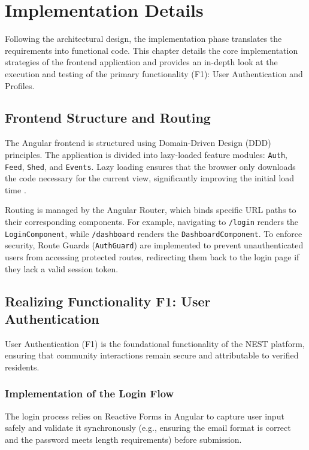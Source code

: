 \chapter{Implementation Details}
\label{chap:implementation-details}

Following the architectural design, the implementation phase translates the requirements into functional code. This chapter details the core implementation strategies of the frontend application and provides an in-depth look at the execution and testing of the primary functionality (F1): User Authentication and Profiles.

\section{Frontend Structure and Routing}
The Angular frontend is structured using Domain-Driven Design (DDD) principles. The application is divided into lazy-loaded feature modules: \texttt{Auth}, \texttt{Feed}, \texttt{Shed}, and \texttt{Events}. Lazy loading ensures that the browser only downloads the code necessary for the current view, significantly improving the initial load time \cite{angularDocs}.

Routing is managed by the Angular Router, which binds specific URL paths to their corresponding components. For example, navigating to \texttt{/login} renders the \texttt{LoginComponent}, while \texttt{/dashboard} renders the \texttt{DashboardComponent}. To enforce security, Route Guards (\texttt{AuthGuard}) are implemented to prevent unauthenticated users from accessing protected routes, redirecting them back to the login page if they lack a valid session token.

\section{Realizing Functionality F1: User Authentication}
User Authentication (F1) is the foundational functionality of the NEST platform, ensuring that community interactions remain secure and attributable to verified residents.

\subsection{Implementation of the Login Flow}
The login process relies on Reactive Forms in Angular to capture user input safely and validate it synchronously (e.g., ensuring the email format is correct and the password meets length requirements) before submission.

